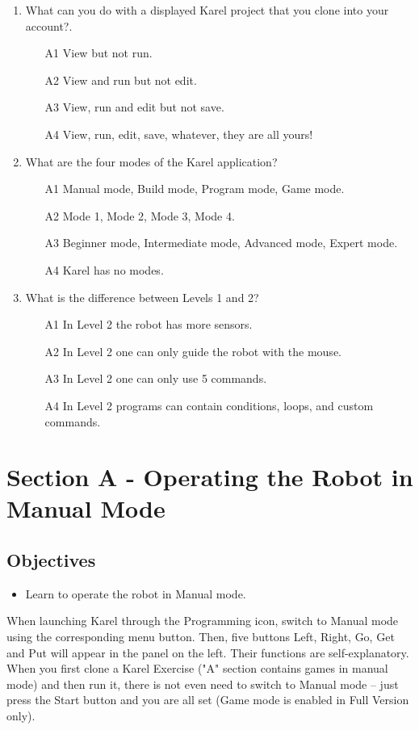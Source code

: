 \documentclass[article,A4,12pt]{llncs}
\begin{document}
\begin{enumerate}
\item What can you do with a displayed Karel project that you clone into your account?.
\begin{enumerate}
\item[A1] View but not run.
\item[A2] View and run but not edit.
\item[A3] View, run and edit but not save.
\item[A4] View, run, edit, save, whatever, they are all yours!
\end{enumerate}
\item What are the four modes of the Karel application?
\begin{enumerate}
\item[A1] Manual mode, Build mode, Program mode, Game mode.
\item[A2] Mode 1, Mode 2, Mode 3, Mode 4.
\item[A3] Beginner mode, Intermediate mode, Advanced mode, Expert mode.
\item[A4] Karel has no modes.
\end{enumerate}
\item What is the difference between Levels 1 and 2?
\begin{enumerate}
\item[A1] In Level 2 the robot has more sensors. 
\item[A2] In Level 2 one can only guide the robot with the mouse.
\item[A3] In Level 2 one can only use 5 commands.
\item[A4] In Level 2 programs can contain 
      conditions, loops, and custom commands.
\end{enumerate}
\end{enumerate}


\section{Section A - Operating the Robot in Manual Mode}

\subsection{Objectives} 
\begin{itemize}
\item Learn to operate the robot in Manual mode.
\end{itemize}
When launching Karel through the Programming icon, switch to Manual mode using the corresponding 
menu button. Then, five buttons Left, Right, Go, Get and Put will appear in the panel on the left.
Their functions are self-explanatory. When you first clone a Karel Exercise ("A" section contains 
games in manual mode) and then 
run it, there is not even need to switch to Manual mode -- just press the Start button and you are 
all set (Game mode is enabled in Full Version only).
\end{document}
